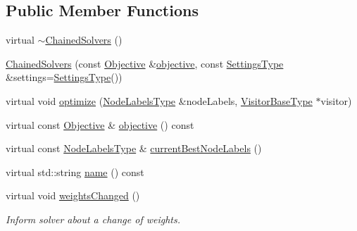 \subsection*{Public Member Functions}
\begin{DoxyCompactItemize}
\item 
virtual \hyperlink{classnifty_1_1graph_1_1optimization_1_1multicut_1_1ChainedSolvers_aa5687b60a85078cd1506061e1fbc5ac6}{$\sim$\+Chained\+Solvers} ()
\item 
\hyperlink{classnifty_1_1graph_1_1optimization_1_1multicut_1_1ChainedSolvers_a7e6123fb0c295233868c2578534cd769}{Chained\+Solvers} (const \hyperlink{classnifty_1_1graph_1_1optimization_1_1multicut_1_1ChainedSolvers_a0b89fffeac7c1d2c8133f26a024af5a3}{Objective} \&\hyperlink{classnifty_1_1graph_1_1optimization_1_1multicut_1_1ChainedSolvers_a80b664e553c789f5297784dc0b936e49}{objective}, const \hyperlink{structnifty_1_1graph_1_1optimization_1_1multicut_1_1ChainedSolvers_1_1SettingsType}{Settings\+Type} \&settings=\hyperlink{structnifty_1_1graph_1_1optimization_1_1multicut_1_1ChainedSolvers_1_1SettingsType}{Settings\+Type}())
\item 
virtual void \hyperlink{classnifty_1_1graph_1_1optimization_1_1multicut_1_1ChainedSolvers_a8e44e36e998710046931566948a4e073}{optimize} (\hyperlink{classnifty_1_1graph_1_1optimization_1_1multicut_1_1ChainedSolvers_a259cf07811ed206783e18959da3351dd}{Node\+Labels\+Type} \&node\+Labels, \hyperlink{classnifty_1_1graph_1_1optimization_1_1multicut_1_1ChainedSolvers_a73196408ad592adcb3e3a89fef73fb69}{Visitor\+Base\+Type} $\ast$visitor)
\item 
virtual const \hyperlink{classnifty_1_1graph_1_1optimization_1_1multicut_1_1ChainedSolvers_a0b89fffeac7c1d2c8133f26a024af5a3}{Objective} \& \hyperlink{classnifty_1_1graph_1_1optimization_1_1multicut_1_1ChainedSolvers_a80b664e553c789f5297784dc0b936e49}{objective} () const 
\item 
virtual const \hyperlink{classnifty_1_1graph_1_1optimization_1_1multicut_1_1ChainedSolvers_a259cf07811ed206783e18959da3351dd}{Node\+Labels\+Type} \& \hyperlink{classnifty_1_1graph_1_1optimization_1_1multicut_1_1ChainedSolvers_abf5ae9ae4dd56194ee643065a8d184eb}{current\+Best\+Node\+Labels} ()
\item 
virtual std\+::string \hyperlink{classnifty_1_1graph_1_1optimization_1_1multicut_1_1ChainedSolvers_a47d166751f2f007003953a8aebe3441f}{name} () const 
\item 
virtual void \hyperlink{classnifty_1_1graph_1_1optimization_1_1multicut_1_1ChainedSolvers_aa66fd3cc2ae9114c7f3ef4acf70356bc}{weights\+Changed} ()
\begin{DoxyCompactList}\small\item\em Inform solver about a change of weights. \end{DoxyCompactList}\end{DoxyCompactItemize}


